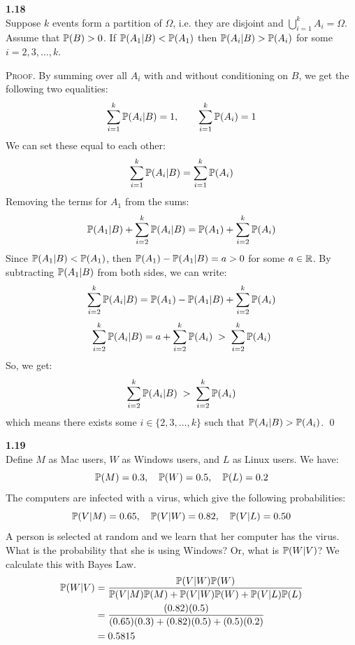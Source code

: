 \bigskip\noindent
\textbf{1.18}\\  %
Suppose $k$ events form a partition of $\Omega$, i.e. they are disjoint and
$\bigcup_{i=1}^k A_i = \Omega$. Assume that $\P(B) > 0$. If $\P(A_1|B) < \P(A_1)$
then $\P(A_i|B) > \P(A_i)$ for some $i = 2,3,\ldots, k$.

\medskip\noindent
\textsc{Proof}. %
By summing over all $A_i$ with and without conditioning on $B$, we get the following two equalities:
$$
\sum_{i=1}^k \P(A_i|B) = 1,
\qquad
\sum_{i=1}^k \P(A_i) = 1
$$
We can set these equal to each other:
$$
\sum_{i=1}^k \P(A_i|B) = \sum_{i=1}^k \P(A_i) 
$$
Removing the terms for $A_1$ from the sums:
$$
\P(A_1|B) + \sum_{i=2}^k \P(A_i|B) = \P(A_1) + \sum_{i=2}^k \P(A_i) 
$$
Since $\P(A_1|B) < \P(A_1)$, then $\P(A_1) - \P(A_1|B) = a > 0$ for some $a\in\R$. By subtracting $\P(A_1|B)$ from
both sides, we can write:
$$
\sum_{i=2}^k \P(A_i|B) = \P(A_1) - \P(A_1|B) + \sum_{i=2}^k \P(A_i) 
$$
$$
\sum_{i=2}^k \P(A_i|B) = a + \sum_{i=2}^k \P(A_i) \;>\; \sum_{i=2}^k \P(A_i)
$$
So, we get:
$$
\sum_{i=2}^k \P(A_i|B) \;>\; \sum_{i=2}^k \P(A_i)
$$
which means there exists some $i\in\{2, 3, \ldots, k\}$ such that $\P(A_i|B) > \P(A_i)$. \qed



\newpage\noindent
\textbf{1.19}\\  %
Define $M$ as Mac users, $W$ as Windows users, and $L$ as Linux users. We have:
$$
\P(M) = 0.3,\quad
\P(W) = 0.5,\quad
\P(L) = 0.2
$$
The computers are infected with a virus, which give the following probabilities:
$$
\P(V|M) = 0.65,\quad
\P(V|W) = 0.82,\quad
\P(V|L) = 0.50
$$
A person is selected at random and we learn that her computer has the virus. What is
the probability that she is using Windows? Or, what is $\P(W|V)$? We calculate this
with Bayes Law.
\begin{align*}
    \P(W|V) &= \frac{\P(V|W)\P(W)}{\P(V|M)\P(M) + \P(V|W)\P(W) + \P(V|L)\P(L)} \\
    &= \frac{(0.82)(0.5)}{(0.65)(0.3) + (0.82)(0.5) + (0.5)(0.2)} \\
    &= 0.5815
\end{align*}

